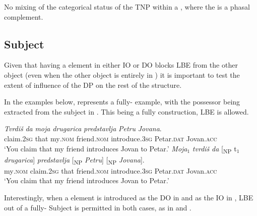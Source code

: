 \documentclass[output=paper,hidelinks,newtxmath,]{langscibook}
\begin{document}
\ea\label{15:ex26}
  No mixing of the categorical status of the TNP within a , where the  is a phasal complement.
\z

\subsection{Subject}\label{15:s5.3}

Given that having a  element in either IO or DO blocks LBE from the other object (even when the other object is entirely in ) it is important to test the extent of influence of the  DP on the rest of the structure.

In the examples below,  represents a fully- example, with the possessor being extracted from the subject in . This being a fully  construction, LBE is allowed.

\ea \label{15:ex27}
	\ea\label{15:ex27a}
    \gll \textit{Tvrdiš} \textit{da} \textit{moja} \textit{drugarica} \textit{predstavlja} \textit{Petru} \textit{Jovana}.\\          
         claim\textsc{.2sg} that my\textsc{.nom} friend\textsc{.nom} introduce\textsc{.3sg} Petar\textsc{.dat} Jovan\textsc{.acc}\\
         \glt `You claim that my friend introduces Jovan to Petar.'
	\ex\label{15:ex27b}
    \gll \textit{Moja}$_1$ \textit{tvrdiš} \textit{da} [\textsubscript{NP} t$_1$ \textit{drugarica}] \textit{predstavlja} [\textsubscript{NP} \textit{Petru}] [\textsubscript{NP} \textit{Jovana}].\\
         my\textsc{.nom} claim\textsc{.2sg} that {} {} friend\textsc{.nom} introduce\textsc{.3sg} {} Petar\textsc{.dat} {} Jovan\textsc{.acc}\\ 
         \glt `You claim that my friend introduces Jovan to Petar.'
	\z
\z

\noindent Interestingly, when a  element is introduced as the DO in  and as the IO in , LBE out of a fully- Subject is permitted in both cases, as in  and .
\end{document}
